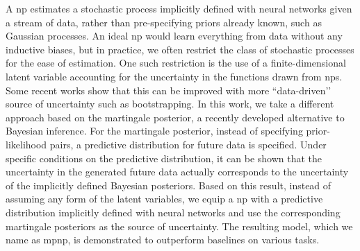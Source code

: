 A \gls{np} estimates a stochastic process implicitly defined with neural networks given a stream of data, rather than pre-specifying priors already known, such as Gaussian processes. An ideal \gls{np} would learn everything from data without any inductive biases, but in practice, we often restrict the class of stochastic processes for the ease of estimation. One such restriction is the use of a finite-dimensional latent variable accounting for the uncertainty in the functions drawn from \glspl{np}. Some recent works show that this can be improved with more ``data-driven’’ source of uncertainty such as bootstrapping. In this work, we take a different approach based on the martingale posterior, a recently developed alternative to Bayesian inference. For the martingale posterior, instead of specifying prior-likelihood pairs, a predictive distribution for future data is specified. Under specific conditions on the predictive distribution, it can be shown that the uncertainty in the generated future data actually corresponds to the uncertainty of the implicitly defined Bayesian posteriors. Based on this result, instead of assuming any form of the latent variables, we equip a \gls{np} with a predictive distribution implicitly defined with neural networks and use the corresponding martingale posteriors as the source of uncertainty. The resulting model, which we name as \gls{mpnp}, is demonstrated to outperform baselines on various tasks.
